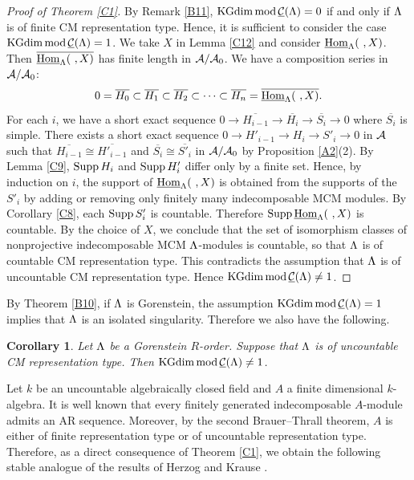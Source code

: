 \documentclass[11pt]{amsart}
\newtheorem{corollary}[theorem]{Corollary}
\theoremstyle{definition}
\numberwithin{equation}{section}
\begin{document}
\begin{proof}[Proof of Theorem \ref{C1}] 
By Remark \ref{B11}, $\KGdim \modsCML = 0$ if and only if $\LL$ is of finite CM representation type. 
Hence, it is sufficient to consider the case $\KGdim \modsCML = 1$. 
We take $X$ in Lemma \ref{C12} and consider $ \sHomL(\ ,  X)$. 
Then $\overline{ \sHomL (\ , X) }$ has finite length in $\AA /\AA_0$. 
We have a composition series in $\AA /\AA_0$:
$$
0 = \overline{H_0} \subset \overline{H_1} \subset \overline{H_2} \subset \cdots  \subset \overline{H_n} = \overline{ \sHomL (\ , X) }. 
$$
For each $i$, we have a short exact sequence $0 \to \overline{H_{i-1}} \to \overline{H_{i}} \to \overline{S_i} \to 0$ where $\overline{S_i}$ is simple. 
There exists a short exact sequence $0 \to H'_{i-1} \to H_{i} \to S'_i \to 0$ in $\AA$ such that $\overline{H_{i-1}} \cong \overline{H'_{i-1}}$ and $\overline{S_{i}} \cong \overline{S'_{i}}$ in $\AA / \AA_0$ by Proposition \ref{A2}(2). 
By Lemma \ref{C9}, $\Supp H_i$ and $\Supp H'_i$ differ only by a finite set. 
Hence, by induction on $i$, the support of $ \sHomL(\ , X)$ is obtained from the supports of the $S'_i$ by adding or removing only finitely many indecomposable MCM modules.
By Corollary \ref{C8}, each $\Supp S' _i$ is countable. 
Therefore $\Supp  \sHomL (\ , X)$ is countable. 
By the choice of $X$, we conclude that the set of isomorphism classes of nonprojective indecomposable MCM $\LL$-modules is countable, so that $\LL$ is of countable CM representation type. 
This contradicts the assumption that $\LL$ is of uncountable CM representation type. 
Hence $\KGdim \modsCML \neq 1$.
\end{proof}


By Theorem \ref{B10}, if $\LL$ is Gorenstein, the assumption $\KGdim \modsCML = 1$ implies that $\LL$ is an isolated singularity. 
Therefore we also have the following. 


\begin{corollary}\label{C10}
Let $\LL$ be a Gorenstein $R$-order. 
Suppose that $\LL$ is of uncountable CM representation type. Then $\KGdim \modsCML \neq 1$. 
\end{corollary}


Let $k$ be an uncountable algebraically closed field and $A$ a finite dimensional $k$-algebra. 
It is well known that every finitely generated indecomposable $A$-module admits an AR sequence.
Moreover, by the second Brauer--Thrall theorem, $A$ is either of finite representation type or of uncountable representation type. 
Therefore, as a direct consequence of Theorem \ref{C1}, we obtain the following stable analogue of the results of Herzog \cite{He97} and Krause \cite{Kr98}.
\end{document}
